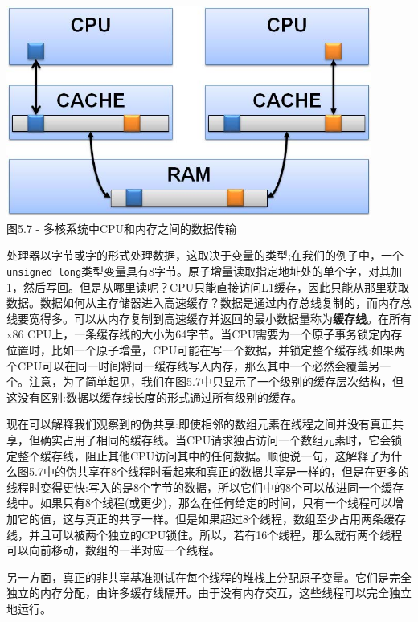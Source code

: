 \hspace*{\fill} \\ %
\begin{center}
\includegraphics[width=0.9\textwidth]{content/1/chapter5/images/7.jpg}\\
图5.7 - 多核系统中CPU和内存之间的数据传输
\end{center}

处理器以字节或字的形式处理数据，这取决于变量的类型;在我们的例子中，一个\texttt{unsigned long}类型变量具有8字节。原子增量读取指定地址处的单个字，对其加1，然后写回。但是从哪里读呢？CPU只能直接访问L1缓存，因此只能从那里获取数据。数据如何从主存储器进入高速缓存？数据是通过内存总线复制的，而内存总线要宽得多。可以从内存复制到高速缓存并返回的最小数据量称为\textbf{缓存线}。在所有x86 CPU上，一条缓存线的大小为64字节。当CPU需要为一个原子事务锁定内存位置时，比如一个原子增量，CPU可能在写一个数据，并锁定整个缓存线:如果两个CPU可以在同一时间将同一缓存线写入内存，那么其中一个必然会覆盖另一个。注意，为了简单起见，我们在图5.7中只显示了一个级别的缓存层次结构，但这没有区别:数据以缓存线长度的形式通过所有级别的缓存。

现在可以解释我们观察到的伪共享:即使相邻的数组元素在线程之间并没有真正共享，但确实占用了相同的缓存线。当CPU请求独占访问一个数组元素时，它会锁定整个缓存线，阻止其他CPU访问其中的任何数据。顺便说一句，这解释了为什么图5.7中的伪共享在8个线程时看起来和真正的数据共享是一样的，但是在更多的线程时变得更快:写入的是8个字节的数据，所以它们中的8个可以放进同一个缓存线中。如果只有8个线程(或更少)，那么在任何给定的时间，只有一个线程可以增加它的值，这与真正的共享一样。但是如果超过8个线程，数组至少占用两条缓存线，并且可以被两个独立的CPU锁住。所以，若有16个线程，那么就有两个线程可以向前移动，数组的一半对应一个线程。

另一方面，真正的非共享基准测试在每个线程的堆栈上分配原子变量。它们是完全独立的内存分配，由许多缓存线隔开。由于没有内存交互，这些线程可以完全独立地运行。

